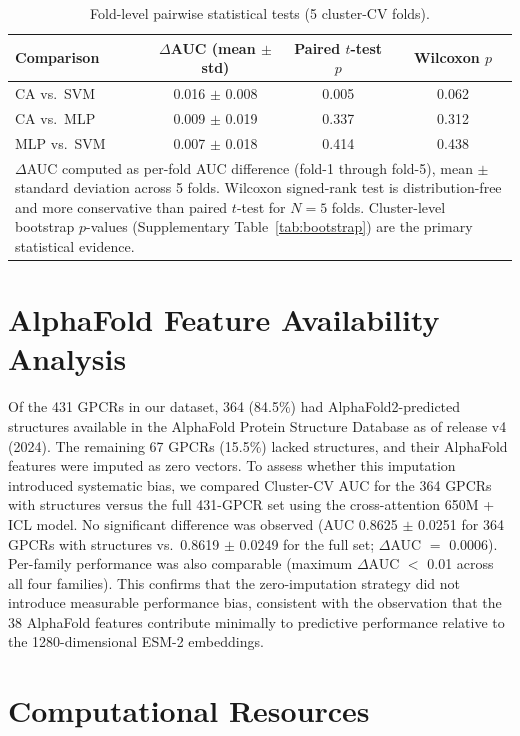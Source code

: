 \documentclass[11pt,a4paper]{article}
\begin{document}
\begin{table}[h!]
\centering
\caption{Fold-level pairwise statistical tests (5 cluster-CV folds).}
\label{tab:fold_tests}
\begin{tabular}{lccc}
\toprule
Comparison & $\Delta$AUC (mean $\pm$ std) & Paired $t$-test $p$ & Wilcoxon $p$ \\
\midrule
CA vs.\ SVM  & 0.016 $\pm$ 0.008 & 0.005 & 0.062 \\
CA vs.\ MLP  & 0.009 $\pm$ 0.019 & 0.337 & 0.312 \\
MLP vs.\ SVM & 0.007 $\pm$ 0.018 & 0.414 & 0.438 \\
\bottomrule
\multicolumn{4}{p{0.88\textwidth}}{\small $\Delta$AUC computed as per-fold AUC difference (fold-1 through fold-5), mean $\pm$ standard deviation across 5 folds. Wilcoxon signed-rank test is distribution-free and more conservative than paired $t$-test for $N=5$ folds. Cluster-level bootstrap $p$-values (Supplementary Table~\ref{tab:bootstrap}) are the primary statistical evidence.} \\
\end{tabular}
\end{table}

\section{AlphaFold Feature Availability Analysis}

Of the 431 GPCRs in our dataset, 364 (84.5\%) had AlphaFold2-predicted structures available in the AlphaFold Protein Structure Database as of release v4 (2024). The remaining 67 GPCRs (15.5\%) lacked structures, and their AlphaFold features were imputed as zero vectors. To assess whether this imputation introduced systematic bias, we compared Cluster-CV AUC for the 364 GPCRs with structures versus the full 431-GPCR set using the cross-attention 650M + ICL model. No significant difference was observed (AUC 0.8625 $\pm$ 0.0251 for 364 GPCRs with structures vs.\ 0.8619 $\pm$ 0.0249 for the full set; $\Delta$AUC $=$ 0.0006). Per-family performance was also comparable (maximum $\Delta$AUC $<$ 0.01 across all four families). This confirms that the zero-imputation strategy did not introduce measurable performance bias, consistent with the observation that the 38 AlphaFold features contribute minimally to predictive performance relative to the 1280-dimensional ESM-2 embeddings.

\section{Computational Resources}
\end{document}
